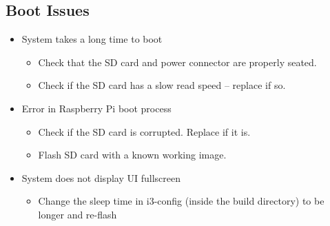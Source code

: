 \subsection{Boot Issues}
\begin{itemize}
    \item System takes a long time to boot
    \begin{itemize}
        \item Check that the SD card and power connector are properly seated.
        \item Check if the SD card has a slow read speed -- replace if so.
    \end{itemize}
    \item Error in Raspberry Pi boot process
    \begin{itemize}
        \item Check if the SD card is corrupted. Replace if it is.
        \item Flash SD card with a known working image.
    \end{itemize}
    \item System does not display UI fullscreen
    \begin{itemize}
        \item Change the sleep time in i3-config (inside the build directory) to be longer and re-flash
    \end{itemize}
\end{itemize}

